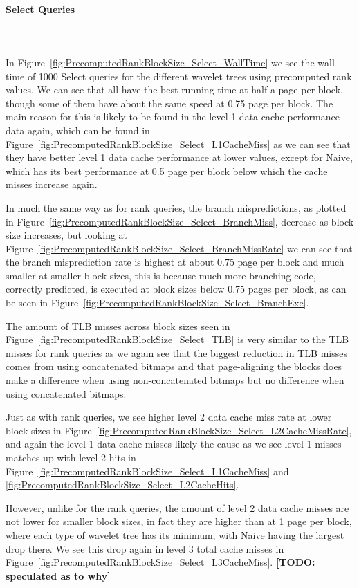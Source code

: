 \paragraph{Select Queries}~\\\\
In Figure~\ref{fig:PrecomputedRankBlockSize_Select_WallTime} we see the wall time of 1000 Select queries for the different wavelet trees using precomputed rank values.
We can see that all have the best running time at half a page per block, though some of them have about the same speed at 0.75 page per block.
The main reason for this is likely to be found in the level 1 data cache performance data again, which can be found in Figure~\ref{fig:PrecomputedRankBlockSize_Select_L1CacheMiss} as we can see that they have better level 1 data cache performance at lower values, except for Naive, which has its best performance at 0.5 page per block below which the cache misses increase again.

In much the same way as for rank queries, the branch mispredictions, as plotted in Figure~\ref{fig:PrecomputedRankBlockSize_Select_BranchMiss}, decrease as block size increases, but looking at Figure~\ref{fig:PrecomputedRankBlockSize_Select_BranchMissRate} we can see that the branch misprediction rate is highest at about 0.75 page per block and much smaller at smaller block sizes, this is because much more branching code, correctly predicted, is executed at block sizes below 0.75 pages per block, as can be seen in Figure~\ref{fig:PrecomputedRankBlockSize_Select_BranchExe}.

The amount of TLB misses across block sizes seen in Figure~\ref{fig:PrecomputedRankBlockSize_Select_TLB} is very similar to the TLB misses for rank queries as we again see that the biggest reduction in TLB misses comes from using concatenated bitmaps and that page-aligning the blocks does make a difference when using non-concatenated bitmaps but no difference when using concatenated bitmaps.

Just as with rank queries, we see higher level 2 data cache miss rate at lower block sizes in Figure~\ref{fig:PrecomputedRankBlockSize_Select_L2CacheMissRate}, and again the level 1 data cache misses likely the cause as we see level 1 misses matches up with level 2 hits in Figure~\ref{fig:PrecomputedRankBlockSize_Select_L1CacheMiss} and \ref{fig:PrecomputedRankBlockSize_Select_L2CacheHits}.

However, unlike for the rank queries, the amount of level 2 data cache misses are not lower for smaller block sizes, in fact they are higher than at 1 page per block, where each type of wavelet tree has its minimum, with Naive having the largest drop there.
We see this drop again in level 3 total cache misses in Figure~\ref{fig:PrecomputedRankBlockSize_Select_L3CacheMiss}.
\textbf{[TODO: speculated as to why]}

